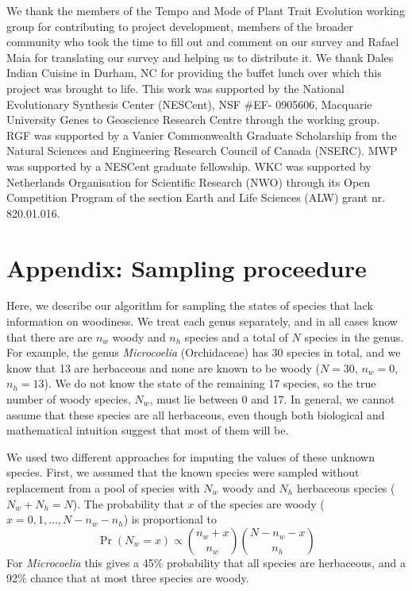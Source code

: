 \documentclass[12pt]{article}
\begin{document}
We thank the members of the Tempo and Mode of Plant Trait
Evolution working group for contributing to project development,
members of the broader community who took the time to fill out and
comment on our survey and Rafael Maia for translating our survey and
helping us to distribute it.
We thank Dales Indian Cuisine in Durham, NC for providing the buffet
lunch over which this project was brought to life.
%
This work was supported by the National Evolutionary Synthesis Center
(NESCent), NSF \#EF- 0905606, Macquarie University Genes to Geoscience
Research Centre through the working group.
%
RGF was supported by a Vanier Commonwealth Graduate Scholarship from
the Natural Sciences and Engineering Research Council of Canada
(NSERC).
MWP was supported by a NESCent graduate fellowship.
%
WKC was supported by Netherlands Organisation for
Scientific Research (NWO) through its Open Competition Program of the
section Earth and Life Sciences (ALW) grant nr. 820.01.016.

\section{Appendix: Sampling proceedure}

Here, we describe our algorithm for sampling the states of species
that lack information on woodiness. We treat each genus separately,
and in all cases know that there are are $n_w$ woody and $n_h$ species
and a total of $N$ species in the genus.
%
For example, the genus \textit{Microcoelia} (Orchidaceae) has 30
species in total, and we know that 13 are herbaceous and none are
known to be woody ($N = 30$, $n_w = 0$, $n_h = 13$). We do not know
the state of the remaining 17 species, so the true number of woody
species, $N_w$, must lie between 0 and 17. In general, we cannot
assume that these species are all herbaceous, even though both
biological and mathematical intuition suggest that most of them will
be.

We used two different approaches for imputing the values of these
unknown species. First, we assumed that the known species were
sampled without replacement from a pool of species with $N_w$ woody
and $N_h$ herbaceous species ($N_w + N_h = N$). The probability that
$x$ of the species are woody ($x = 0, 1, \ldots, N - n_w - n_h$) is
proportional to
\begin{equation}
  \Pr(N_w = x) \propto {n_w + x \choose n_w}
  {N - n_w - x \choose n_h}
\end{equation}
For \textit{Microcoelia} this gives a 45\% probability that all
species are herbaceous, and a 92\% chance that at most three species
are woody.
\end{document}
